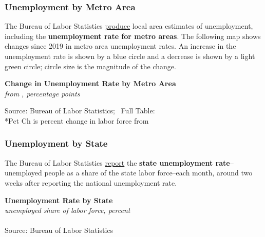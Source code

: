\documentclass{report}
\newcommand{\tbllink}[1]{\href{https://raw.githubusercontent.com/bdecon/US-chartbook/master/chartbook/data/#1}{\faTable}}
\begin{document}
{{\begin{minipage}{0.76\textwidth}
\subsubsection*{Unemployment by Metro Area}
\vspace{-1mm}

\small The Bureau of Labor Statistics \href{https://www.bls.gov/lau/}{produce} local area estimates of unemployment, including the \textbf{unemployment rate for metro areas}. The following map shows changes since 2019 in metro area unemployment rates. An increase in the unemployment rate is shown by a blue circle and a decrease is shown by a light green circle; circle size is the magnitude of the change. 


\end{minipage}
\vspace{1mm}

\begin{minipage}{0.82\textwidth}
\normalsize \textbf{Change in Unemployment Rate by Metro Area}\\
\footnotesize{\textit{from \unskip, percentage points}}
\vspace{-4mm}

\hspace*{-8mm} 
\vspace{-3mm}

\footnotesize{Source: Bureau of Labor Statistics; \ Full Table: \tbllink{msa_unemp_rate.csv} \\ \**Pct Ch is percent change in labor force from }
\end{minipage}
\newpage
\begin{minipage}{0.76\textwidth}
\subsubsection*{Unemployment by State}
\small The Bureau of Labor Statistics \href{https://www.bls.gov/lau/}{report} the \textbf{state unemployment rate}--unemployed people as a share of the state labor force--each month, around two weeks after reporting the national unemployment rate. 
\vspace{1mm}

\normalsize \textbf{Unemployment Rate by State}\\
\footnotesize{\textit{unemployed share of labor force, percent}}\\
\vspace{-2mm}
\hspace{-10mm}  \\
\footnotesize{Source: Bureau of Labor Statistics}
\end{minipage}
\newpage
\begin{minipage}{0.76\textwidth}

\end{minipage}}}
\end{document}
